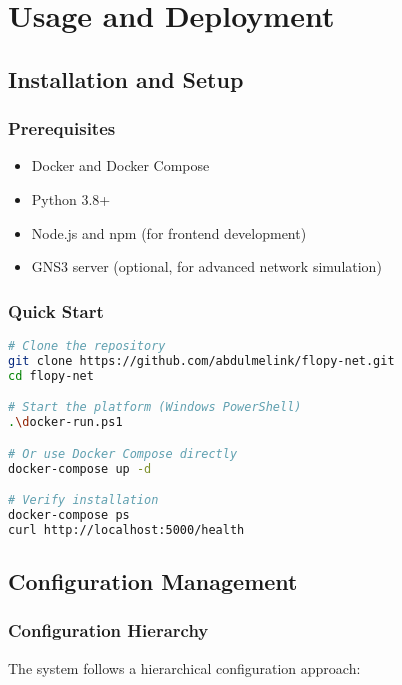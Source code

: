 \documentclass[12pt,a4paper,twoside]{article}
\begin{document}
\section{Usage and Deployment}

\subsection{Installation and Setup}

\subsubsection{Prerequisites}

\begin{itemize}
    \item Docker and Docker Compose
    \item Python 3.8+
    \item Node.js and npm (for frontend development)
    \item GNS3 server (optional, for advanced network simulation)
\end{itemize}

\subsubsection{Quick Start}

\begin{lstlisting}[language=bash, caption=Installation Commands]
# Clone the repository
git clone https://github.com/abdulmelink/flopy-net.git
cd flopy-net

# Start the platform (Windows PowerShell)
.\docker-run.ps1

# Or use Docker Compose directly
docker-compose up -d

# Verify installation
docker-compose ps
curl http://localhost:5000/health
\end{lstlisting}

\subsection{Configuration Management}

\subsubsection{Configuration Hierarchy}

The system follows a hierarchical configuration approach:
\end{document}
